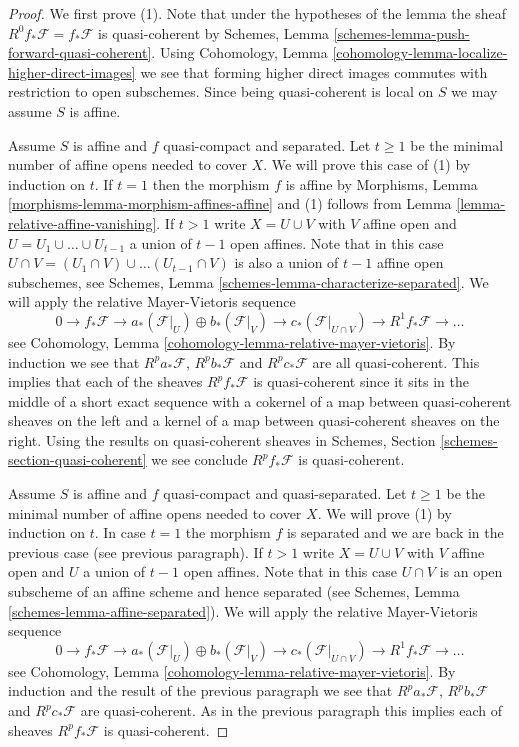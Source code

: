 \begin{proof}
We first prove (1). Note that under the hypotheses of the lemma the sheaf
$R^0f_*\mathcal{F} = f_*\mathcal{F}$ is quasi-coherent by
Schemes, Lemma \ref{schemes-lemma-push-forward-quasi-coherent}.
Using
Cohomology, Lemma \ref{cohomology-lemma-localize-higher-direct-images}
we see that forming higher direct images commutes with restriction
to open subschemes. Since being quasi-coherent is local on $S$ we
may assume $S$ is affine.

\medskip\noindent
Assume $S$ is affine and $f$ quasi-compact and separated.
Let $t \geq 1$ be the minimal number of affine opens needed to cover $X$.
We will prove this case of (1) by induction on $t$.
If $t = 1$ then the morphism $f$ is affine by
Morphisms, Lemma \ref{morphisms-lemma-morphism-affines-affine}
and (1) follows from
Lemma \ref{lemma-relative-affine-vanishing}.
If $t > 1$ write $X = U \cup V$ with $V$ affine open and
$U = U_1 \cup \ldots \cup U_{t - 1}$ a union of $t - 1$ open affines.
Note that in this case
$U \cap V =  (U_1 \cap V) \cup \ldots (U_{t - 1} \cap V)$
is also a union of $t - 1$ affine open subschemes, see
Schemes, Lemma \ref{schemes-lemma-characterize-separated}.
We will apply the relative Mayer-Vietoris sequence
$$
0 \to
f_*\mathcal{F} \to
a_*(\mathcal{F}|_U) \oplus b_*(\mathcal{F}|_V) \to
c_*(\mathcal{F}|_{U \cap V}) \to
R^1f_*\mathcal{F} \to \ldots
$$
see Cohomology, Lemma \ref{cohomology-lemma-relative-mayer-vietoris}.
By induction we see that
$R^pa_*\mathcal{F}$, $R^pb_*\mathcal{F}$ and $R^pc_*\mathcal{F}$
are all quasi-coherent. This implies that each of the sheaves
$R^pf_*\mathcal{F}$ is quasi-coherent since it sits in the middle of a short
exact sequence with a cokernel of a map between quasi-coherent sheaves
on the left and a kernel of a map between quasi-coherent sheaves on the right.
Using the results on quasi-coherent sheaves in
Schemes, Section \ref{schemes-section-quasi-coherent} we see
conclude $R^pf_*\mathcal{F}$ is quasi-coherent.

\medskip\noindent
Assume $S$ is affine and $f$ quasi-compact and quasi-separated.
Let $t \geq 1$ be the minimal number of affine opens needed to cover $X$.
We will prove (1) by induction on $t$.
In case $t = 1$ the morphism $f$ is separated and we are back
in the previous case (see previous paragraph).
If $t > 1$ write $X = U \cup V$ with $V$ affine open and
$U$ a union of $t - 1$ open affines.
Note that in this case $U \cap V$ is an open subscheme of an affine
scheme and hence separated (see
Schemes, Lemma \ref{schemes-lemma-affine-separated}).
We will apply the relative Mayer-Vietoris sequence
$$
0 \to
f_*\mathcal{F} \to
a_*(\mathcal{F}|_U) \oplus b_*(\mathcal{F}|_V) \to
c_*(\mathcal{F}|_{U \cap V}) \to
R^1f_*\mathcal{F} \to \ldots
$$
see Cohomology, Lemma \ref{cohomology-lemma-relative-mayer-vietoris}.
By induction and the result of the previous paragraph we see that
$R^pa_*\mathcal{F}$, $R^pb_*\mathcal{F}$ and $R^pc_*\mathcal{F}$
are quasi-coherent. As in the previous paragraph this implies each of
sheaves $R^pf_*\mathcal{F}$ is quasi-coherent.


\end{proof}
